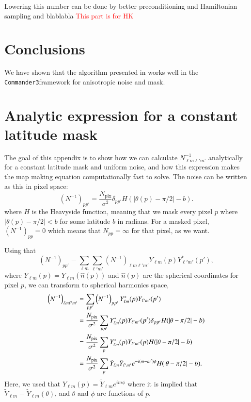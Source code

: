 \documentclass[twocolumn]{../common/aa}
\def\commanderthree{\texttt{Commander3}}
\begin{document}
Lowering this number can be done by better preconditioning and Hamiltonian sampling and blablabla \textcolor{red}{This part is for HK}

\section{Conclusions}
\label{sec:conclusions}

We have shown that the algorithm presented in \cite{racine:2016} works well in the \commanderthree framework for anisotropic noise and mask.





\appendix

\section{Analytic expression for a constant latitude mask}
\label{sec:appendixA}


The goal of this appendix is to show how we can calculate $N_{\ell m \ell' m'}^{-1}$ analytically for a constant latitude mask and uniform noise, and how this expression makes the map making equation computationally fast to solve. The noise can be written as this in pixel space:
$$
\left(N^{-1} \right)_{pp'} = \frac{N_{\mathrm{pix}}}{\sigma^2} \delta_{pp'} H(|\theta(p) -\pi/2|-b).
$$
where $H$ is the Heavyside function, meaning that we mask every pixel $p$ where $|\theta(p) -\pi/2| < b$ for some latitude $b$ in radians. For a masked pixel, $\left(N^{-1} \right)_{pp}=0$ which means that $N_{pp} = \infty$ for that pixel, as we want.

Using that
$$
\left(N^{-1}\right)_{pp'} = \sum_{\ell m}\sum_{\ell' m'} \left(N^{-1}\right)_{\ell m \ell'm'} Y_{\ell m}\left(p\right)Y^*_{\ell' m'}\left(p'\right),
$$
where $Y_{\ell m}\left(p\right) = Y_{\ell m}\left(\hat{n}(p)\right)$ and $\hat{n}(p)$ are the spherical coordinates for pixel $p$, we can transform to spherical harmonics space,
\begin{align}
\nonumber
\left(N^{-1}\right)_{\ell m \ell' m'} &= \sum_{p p'}\left(N^{-1}\right)_{pp'}Y^{*}_{\ell m}(p)Y_{\ell' m'}(p')\\
\nonumber
&= \frac{N_{\mathrm{pix}}}{\sigma^2}\sum_{p p'} Y^{*}_{\ell m}(p)Y_{\ell' m'}(p') \delta_{pp'} H(|\theta -\pi/2|-b)\\
\nonumber
&= \frac{N_{\mathrm{pix}}}{\sigma^2}\sum_{p } Y^{*}_{\ell m}(p)Y_{\ell' m'}(p) H(|\theta -\pi/2|-b)\\
&= \frac{N_{\mathrm{pix}}}{\sigma^2}\sum_p \Tilde{Y}_{\ell m}\Tilde{Y}_{\ell' m'} e^{-i(m-m')\phi} H(|\theta -\pi/2|-b).
\end{align}
Here, we used that $Y_{\ell m}(p) = \tilde{Y}_{\ell m} e^{im\phi}$ where it is implied that $\tilde{Y}_{\ell m}=\tilde{Y}_{\ell m}(\theta)$, and $\theta$ and $\phi$ are functions of $p$.
\end{document}

